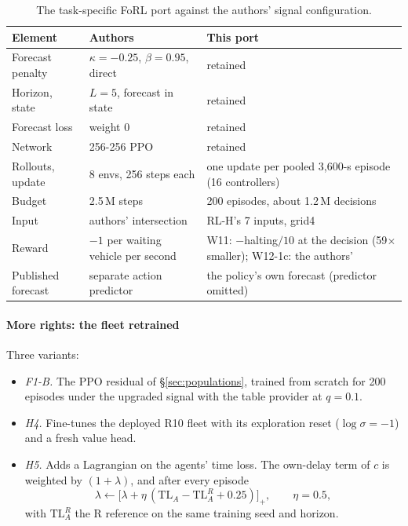 \begin{table}[t]\centering\footnotesize\setlength{\tabcolsep}{3pt}
\caption{The task-specific FoRL port against the authors' signal configuration.}\label{tab:forlport}
\begin{tabular}{@{}p{}p{}p{}@{}}\toprule
Element & Authors & This port\\\midrule
Forecast penalty & $\kappa=-0.25$, $\beta=0.95$, direct & retained\\
Horizon, state & $L=5$, forecast in state & retained\\
Forecast loss & weight 0 & retained\\
Network & 256-256 PPO & retained\\
Rollouts, update & 8 envs, 256 steps each & one update per pooled 3,600-s episode (16 controllers)\\
Budget & 2.5\,M steps & 200 episodes, about 1.2\,M decisions\\
Input & authors' intersection & RL-H's 7 inputs, grid4\\
Reward & $-1$ per waiting vehicle per second & W11: $-$halting$/10$ at the decision (59$\times$ smaller); W12-1c: the authors'\\
Published forecast & separate action predictor & the policy's own forecast (predictor omitted)\\\bottomrule
\end{tabular}\end{table}

\paragraph{More rights: the fleet retrained} Three variants:
\begin{itemize}\setlength\itemsep{1pt}
\item \emph{F1-B.} The PPO residual of §\ref{sec:populations}, trained from scratch for 200 episodes under the upgraded signal with the
table provider at $q=0.1$.
\item \emph{H4.} Fine-tunes the deployed R10 fleet with its exploration reset ($\log\sigma=-1$) and a fresh value head.
\item \emph{H5.} Adds a Lagrangian on the agents' time loss. The own-delay term of $c$ is weighted by $(1+\lambda)$, and after every
episode
\begin{equation}
\lambda\leftarrow\big[\lambda+\eta\,(\mathrm{TL}_A-\mathrm{TL}_A^{R}+0.25)\big]_+,\qquad \eta=0.5,
\end{equation}
with $\mathrm{TL}_A^{R}$ the R reference on the same training seed and horizon.
\end{itemize}

